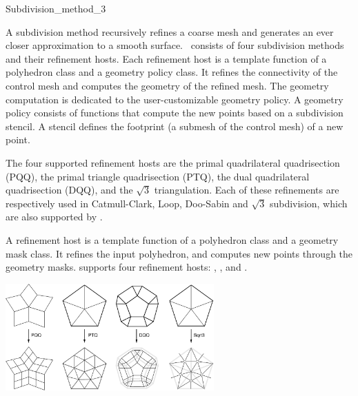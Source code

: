 
\ccRefPageBegin



\begin{ccRefClass}{Subdivision_method_3}

\ccDefinition

A subdivision method recursively refines a coarse mesh and 
generates an ever closer approximation to a smooth surface.
\ccClassTemplateName\ consists of four subdivision methods
and their refinement hosts. Each refinement host is a template 
function of a polyhedron class and a 
geometry policy class. It refines the connectivity of the
control mesh and computes the geometry of the refined mesh.
The geometry computation is dedicated to the user-customizable
geometry policy. A geometry policy consists of functions 
that compute the new points based on a subdivision stencil.
A stencil defines the footprint (a submesh of the control mesh)
of a new point.

The four supported refinement hosts are the 
primal quadrilateral quadrisection (PQQ),
the primal triangle quadrisection (PTQ), 
the dual quadrilateral quadrisection (DQQ), 
and the $\sqrt{3}$ triangulation.
Each of these refinements are respectively used in 
Catmull-Clark, Loop, Doo-Sabin and $\sqrt{3}$ subdivision, which
are also supported by \ccClassTemplateName .


A refinement host is a template function of 
a polyhedron class and a geometry mask class. It refines
the input polyhedron, and computes new points through 
the geometry masks.
 supports four refinement hosts:
, ,  and .

\begin{ccTexOnly}
  \begin{center}
    \parbox{0.6\textwidth}{%
      \includegraphics[width=0.6\textwidth]{Subdivision_method_3_ref/FIG/RefSchemes}%
    }\\ \vspace{0.5cm}
  \end{center}
\end{ccTexOnly}


\end{ccRefClass}
